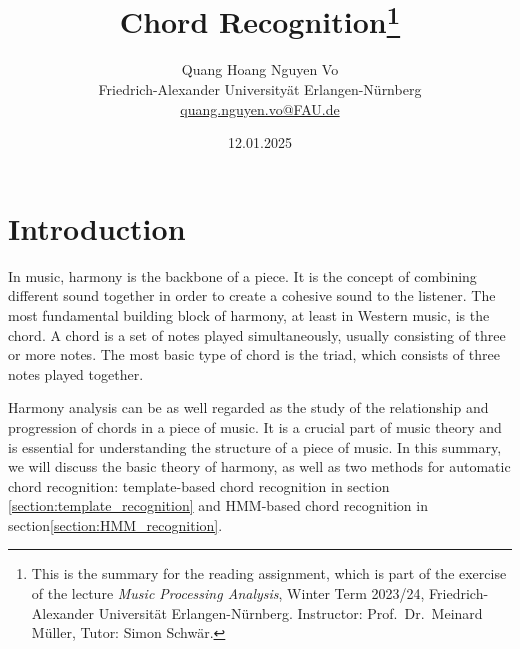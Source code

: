 \documentclass[a4paper, 9pt, twocolumn]{extarticle}
\begin{document}
\date{\normalsize 12.01.2025}

\title{\vspace{-8mm}\textbf{\Large
Chord Recognition\footnote{This is the summary for the reading assignment,
which is part of the exercise of the lecture \emph{Music Processing Analysis}, Winter Term 2023/24,
Friedrich-Alexander Universit\"at Erlangen-N\"urnberg.
Instructor: Prof.\ Dr.\ Meinard M\"uller,
Tutor: Simon Schw\"ar.
}}}

\author{
{
\begin{minipage}{\textwidth}
\center
Quang Hoang Nguyen Vo \\
\small
Friedrich-Alexander University\"at Erlangen-N\"urnberg
\protect\\{} %
\url{quang.nguyen.vo@FAU.de}
\end{minipage}
}
}

\maketitle
\thispagestyle{empty}

\section{Introduction}
\label{section:introduction}

In music, harmony is the backbone of a piece. It is the concept of combining different sound together in order to create a cohesive sound to the listener.
The most fundamental building block of harmony, at least in Western music, is the chord. A chord is a set of notes played simultaneously, usually consisting of three or more notes. The most basic type of chord is the triad, which consists of three notes played together.

Harmony analysis can be as well regarded as the study of the relationship and progression of chords in a piece of music. It is a crucial part of music theory and is essential for understanding the structure of a piece of music. In this summary, we will discuss the basic theory of harmony, as well as two methods for automatic chord recognition: template-based chord recognition in section \ref{section:template_recognition} and HMM-based chord recognition in section\ref{section:HMM_recognition}.


\end{document}
